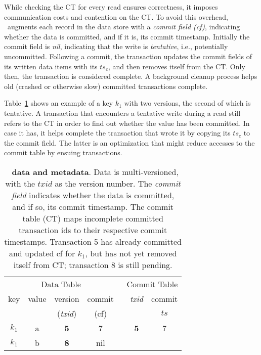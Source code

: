 While checking the CT for every read ensures correctness, it imposes  communication costs and  contention on the CT.
To avoid this overhead, \sys\ augments each record in the data store with a {\em commit field (cf)}, indicating whether the data is committed, and if it is, its commit timestamp.
Initially the commit field is \emph{nil}, indicating that the write is \emph{tentative}, i.e., potentially uncommitted.
Following a commit, the transaction updates the commit fields of its written data items with its $ts_c$, and then removes itself from the CT. 
Only then, the transaction is considered complete. 
A background cleanup process helps old (crashed or otherwise slow) committed transactions complete.

Table~\ref{table:data-model} shows an example of a key $k_1$ with two versions, the second of which is tentative.  
A transaction that encounters a tentative write during a read still refers to the CT in order to find out whether the value has been committed. In case it has, it helps
complete the transaction that wrote it by copying its $ts_c$ to the commit field. The latter is an optimization that might reduce accesses to the commit table by ensuing transactions.

\begin{table}
\begin{tabular}{|c|c|c|c| c| c | c|}
\multicolumn{4}{c}{Data Table}&  \multicolumn{3}{r}{\hspace{1mm} Commit Table}\\
\cline{1-4} \cline{6-7}
key & value & version & commit & & \emph{txid} & commit \\
 &  & (\emph{txid}) & (cf) & &  &  $ts$  \\
\cline{1-4} \cline{6-7}
$k_1$ & a & {\bf 5} & 7& & {\bf 5} & 7 \\
\cline{6-7}
$k_1$ & b & {\bf 8} & nil \\
\cline{1-4}
\end{tabular}

\caption{{\bf \sys\ data and metadata}. Data is multi-versioned, with the $txid$ as the version number. The \emph{commit field} indicates whether the data is committed, and if so, its commit timestamp. The commit table (CT) maps incomplete committed transaction ids to their respective commit timestamps. Transaction 5 has already committed and updated cf for $k_1$, but has not yet removed itself from CT; transaction 8 is still pending.}
\label{table:data-model}
\end{table}

